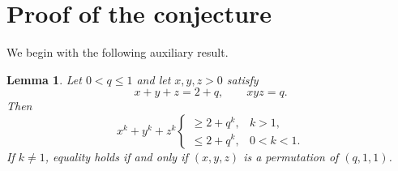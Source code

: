 \documentclass[11pt]{amsart}
\newtheorem{lemma}[theorem]{Lemma}
\theoremstyle{remark}
\begin{document}
\section{Proof of the conjecture}
We begin with the following auxiliary result.

\begin{lemma}\label{lem:power}
Let $0<q\le 1$ and let $x,y,z>0$ satisfy
\begin{equation}\label{eq:constraints}
 x+y+z=2+q,\qquad xyz=q.
\end{equation}
Then
\begin{equation}\label{eq:power}
 x^k+y^k+z^k
 \begin{cases}
 \ge 2+q^k, & k>1,\\[2mm]
 \le 2+q^k, & 0<k<1.
 \end{cases}
\end{equation}
If $k\ne1$, equality holds if and only if $(x,y,z)$ is a permutation of $(q,1,1)$.
\end{lemma}
\end{document}
